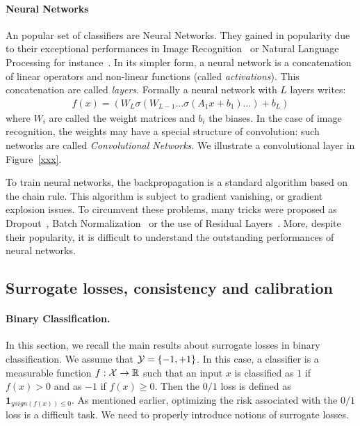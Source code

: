 \paragraph{Neural Networks} An popular set of classifiers are Neural Networks. They gained in popularity due to their exceptional performances in Image Recognition~\cite{krizhevsky2012imagenet,he2016deep} or Natural Language Processing for instance~\cite{xxx}. In its simpler form, a neural network is a concatenation of linear operators and non-linear functions (called \emph{activations}). This concatenation are called \emph{layers}. Formally a neural network with $L$ layers writes:
\begin{align*}
    f(x) = \left(W_L\sigma\left(W_{L-1}\dots \sigma\left(A_1x+b_1\right)\dots\right)+b_L\right)
\end{align*}
where $W_i$ are called the weight matrices and $b_i$ the biases. In the case of image recognition, the weights may have a special structure of convolution: such networks are called \emph{Convolutional Networks}. We illustrate a convolutional layer in Figure~\ref{xxx}.

To train neural networks, the backpropagation is a standard algorithm based on the chain rule. This algorithm is subject to gradient vanishing, or gradient explosion issues. To circumvent these problems, many tricks were proposed as  Dropout~\citep{srivastava2014dropout}, Batch Normalization~\citep{ioffe2015batch} or the use of Residual Layers~\citep{he2016deep}. More, despite their popularity, it is difficult to understand the outstanding performances of neural networks.



\subsection{Surrogate losses, consistency and calibration} 

\paragraph{Binary Classification.} In this section, we recall the main results about surrogate losses in binary classification. We assume that $\mathcal{Y} = \{-1,+1\}$. In this case, a classifier is a measurable function $f:\mathcal{X}\to\mathbb{R}$ such that an input $x$ is classified as $1$ if $f(x)>0$ and as $-1$ if $f(x)\geq 0$. Then the $0/1$ loss is defined as $\mathbf{1}_{ysign(f(x))\leq0}$. As mentioned earlier, optimizing the risk associated with the $0/1$ loss is a difficult task. We need to properly introduce notions of surrogate losses. 

